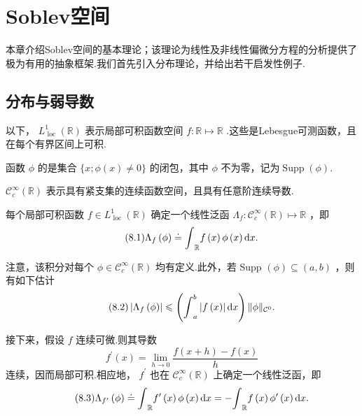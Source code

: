 \chapter{Soblev空间}\vspace{-2em}

本章介绍Soblev空间的基本理论；该理论为线性及非线性偏微分方程的分析提供了极为有用的抽象框架.我们首先引入分布理论，并给出若干启发性例子.

\section{分布与弱导数}

以下， ${L}_{\text{ loc }}^{1}\left( \mathbb{R}\right)$ 表示局部可积函数空间 $f : \mathbb{R} \mapsto  \mathbb{R}$ .这些是Lebesgue可测函数，且在每个有界区间上可积.
\begin{definition}[支集]
    函数 $\phi$ 的是集合 $\{ x;\phi \left( x\right)  \neq  0\}$ 的闭包，其中 $\phi$ 不为零，记为$\operatorname{Supp}\left( \phi \right)$.
\end{definition}
 ${\mathcal{C}}_{c}^{\infty }\left( \mathbb{R}\right)$ 表示具有紧支集的连续函数空间，且具有任意阶连续导数.

每个局部可积函数 $f \in  {L}_{\text{ loc }}^{1}\left( \mathbb{R}\right)$ 确定一个线性泛函 ${\Lambda }_{f} : {\mathcal{C}}_{c}^{\infty }\left( \mathbb{R}\right)  \mapsto  \mathbb{R}$ ，即
\begin{equation}\tag{8.1}\label{eq:distribution-functional}
{\Lambda }_{f}\left( \phi \right)  \doteq  {\int }_{\mathbb{R}}f\left( x\right) \phi \left( x\right) {\mathop{}\!\mathrm{d} x}.
\end{equation}

注意，该积分对每个 $\phi  \in  {\mathcal{C}}_{c}^{\infty }\left( \mathbb{R}\right)$ 均有定义.此外，若 Supp $\left( \phi \right)  \subseteq  \left(  {a,b}\right)$ ，则有如下估计
\begin{equation}\tag{8.2}\label{eq:distribution-functional-bound}
\left| {{\Lambda }_{f}\left( \phi \right) }\right|  \leqslant  \left( {{\int }_{a}^{b}\left| {f\left( x\right) }\right| {\mathop{}\!\mathrm{d} x}}\right) \| \phi {\| }_{{\mathcal{C}}^{0}}.
\end{equation}

接下来，假设 $f$ 连续可微.则其导数
\[
{f}^{\prime }\left( x\right)  = \mathop{\lim }\limits_{{h \rightarrow  0}}\frac{f\left( {x + h}\right)  - f\left( x\right) }{h}
\]
连续，因而局部可积.相应地， ${f}^{\prime }$ 也在 ${\mathcal{C}}_{c}^{\infty }\left( \mathbb{R}\right)$ 上确定一个线性泛函，即
\begin{equation}\tag{8.3}\label{eq:distribution-derivative-by-parts}
{\Lambda }_{{f}^{\prime }}\left( \phi \right)  \doteq  {\int }_{\mathbb{R}}{f}^{\prime }\left( x\right) \phi \left( x\right) {\mathop{}\!\mathrm{d} x} =  - {\int }_{\mathbb{R}}f\left( x\right) {\phi }^{\prime }\left( x\right) {\mathop{}\!\mathrm{d} x}.
\end{equation}

